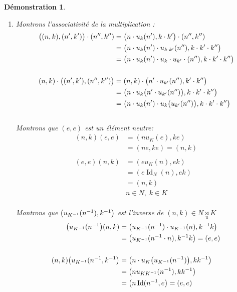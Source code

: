 \documentclass[a4paper, oneside]{report}
\theoremstyle{break}
\newtheorem*{demonstration}{Démonstration}
\DeclarePairedDelimiter\pa{\big(}{\big)}%
\DeclareMathOperator{\Id}{Id}
\newcommand{\us}{\underset}
\newcommand{\Pa}{\pa}
\begin{document}
\begin{demonstration}
\begin{enumerate}
\item  Montrons l'associativité de la multiplication :
\begin{align*}
\pa{(n, k), (n', k')} \cdot (n'', k'') &= \pa{n \cdot u_k (n'), k \cdot k'} \cdot (n'', k'')
\\
&= \pa{n \cdot u_k(n') \cdot u_{k \cdot k'}(n''), k \cdot k' \cdot k''}
\\
&= \pa{n \cdot u_k(n') \cdot u_k \cdot u_{k'} \cdot (n''), k \cdot k' \cdot k''}
\\
\\
(n, k) \cdot \pa{(n', k'), (n'', k'')} &= (n, k) \cdot \pa{n' \cdot u_{k'}(n''), k' \cdot k''}
\\
&= \Pa{n \cdot u_k\pa{n' \cdot u_{k'}(n'')}, k \cdot k' \cdot k''}
\\
&= \Pa{n \cdot u_k(n') \cdot u_k\pa{u_{k'}(n'')}, k \cdot k' \cdot k''}
\end{align*}\\
Montrons que $(e,e)$ est un élément neutre:
\begin{align*}
(n,k)(e,e) &= (n u_K(e), ke)
\\
&= (ne, ke) = (n,k)
\\
\\
(e,e)(n,k) &= (e u_K(n), ek) 
\\
&= (e \Id_N(n), ek) 
\\
&= (n,k)
\\
&n \in N, \; k \in K
\end{align*}\\
Montrons que $\pa{u_{K^{-1}}(n^{-1}), k^{-1}}$ est l'inverse de $(n,k) \in N \us{u}{\rtimes} K$
\begin{align*}
\pa{u_{K^{-1}}(n^{-1}}(n, k) &= \pa{u_{K^{-1}}(n^{-1}) \cdot u_{K^{-1}}(n), k^{-1}k} 
\\
&= \pa{u_{K^{-1}}(n^{-1} \cdot n), k^{-1}k} = (e, e)
\\
\\
(n,k)\pa{u_{K^{-1}}(n^{-1}, k^{-1}} &= \Pa{n \cdot u_K \pa{u_{K^{-1}}(n^{-1})}, kk^{-1}} 
\\
&= \pa{n u_{KK^{-1}}(n^{-1}), kk^{-1}} 
\\
&= \pa{n \Id(n^{-1}, e} = (e, e)
\end{align*}

\bigbreak


\end{enumerate}
\end{demonstration}
\end{document}

